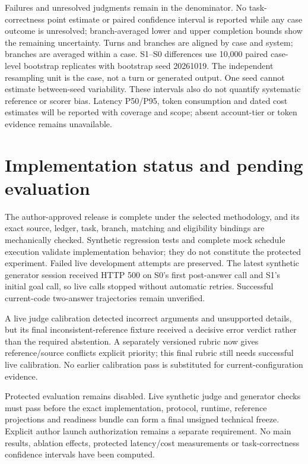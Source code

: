 \documentclass[10pt,conference]{IEEEtran}
\begin{document}
Failures and unresolved judgments remain in the denominator. No task-correctness point estimate or paired confidence interval is reported while any case outcome is unresolved; branch-averaged lower and upper completion bounds show the remaining uncertainty.  Turns and branches are aligned by case and system; branches are averaged within a case. S1--S0 differences use 10,000 paired case-level bootstrap replicates with bootstrap seed 20261019. The independent resampling unit is the case, not a turn or generated output. One seed cannot estimate between-seed variability. These intervals also do not quantify systematic reference or scorer bias. Latency P50/P95, token consumption and dated cost estimates will be reported with coverage and scope; absent account-tier or token evidence remains unavailable.

\section{Implementation status and pending evaluation}
The author-approved release is complete under the selected methodology, and its exact source, ledger, task, branch, matching and eligibility bindings are mechanically checked. Synthetic regression tests and complete mock schedule execution validate implementation behavior; they do not constitute the protected experiment. Failed live development attempts are preserved. The latest synthetic generator session received HTTP 500 on S0's first post-answer call and S1's initial goal call, so live calls stopped without automatic retries. Successful current-code two-answer trajectories remain unverified.

A live judge calibration detected incorrect arguments and unsupported details, but its final inconsistent-reference fixture received a decisive error verdict rather than the required abstention. A separately versioned rubric now gives reference/source conflicts explicit priority; this final rubric still needs successful live calibration. No earlier calibration pass is substituted for current-configuration evidence.

Protected evaluation remains disabled. Live synthetic judge and generator checks must pass before the exact implementation, protocol, runtime, reference projections and readiness bundle can form a final unsigned technical freeze. Explicit author launch authorization remains a separate requirement. No main results, ablation effects, protected latency/cost measurements or task-correctness confidence intervals have been computed.
\end{document}
